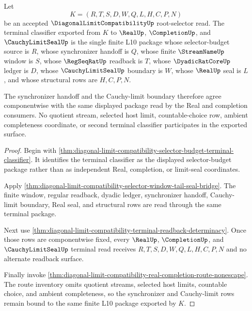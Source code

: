 \begin{theorem}
\label{thm:diagonal-limit-compatibility-terminal-synchronizer-classifier}
Let
$$
K=(R,T,S,D,W,Q,L,H,C,P,N)
$$
be an accepted $\DiagonalLimitCompatibilityUp$ root-selector read. The terminal classifier exported from $K$ to $\RealUp$, $\CompletionUp$, and $\CauchyLimitSealUp$ is the single finite L10 package whose selector-budget source is $R$, whose synchronizer handoff is $Q$, whose finite $\StreamNameUp$ window is $S$, whose $\RegSeqRatUp$ readback is $T$, whose $\DyadicRatCoreUp$ ledger is $D$, whose $\CauchyLimitSealUp$ boundary is $W$, whose $\RealUp$ seal is $L$, and whose structural rows are $H,C,P,N$.

The synchronizer handoff and the Cauchy-limit boundary therefore agree componentwise with the same displayed package read by the Real and completion consumers. No quotient stream, selected host limit, countable-choice row, ambient completeness coordinate, or second terminal classifier participates in the exported surface.
\end{theorem}
\begin{proof}
Begin with \autoref{thm:diagonal-limit-compatibility-selector-budget-terminal-classifier}. It identifies the terminal classifier as the displayed selector-budget package rather than as independent Real, completion, or limit-seal coordinates.

Apply \autoref{thm:diagonal-limit-compatibility-selector-window-tail-seal-bridge}. The finite window, regular readback, dyadic ledger, synchronizer handoff, Cauchy-limit boundary, Real seal, and structural rows are read through the same terminal package.

Next use \autoref{thm:diagonal-limit-compatibility-terminal-readback-determinacy}. Once those rows are componentwise fixed, every $\RealUp$, $\CompletionUp$, and $\CauchyLimitSealUp$ terminal read receives $R,T,S,D,W,Q,L,H,C,P,N$ and no alternate readback surface.

Finally invoke \autoref{thm:diagonal-limit-compatibility-real-completion-route-nonescape}. The route inventory omits quotient streams, selected host limits, countable choice, and ambient completeness, so the synchronizer and Cauchy-limit rows remain bound to the same finite L10 package exported by $K$.
\end{proof}

